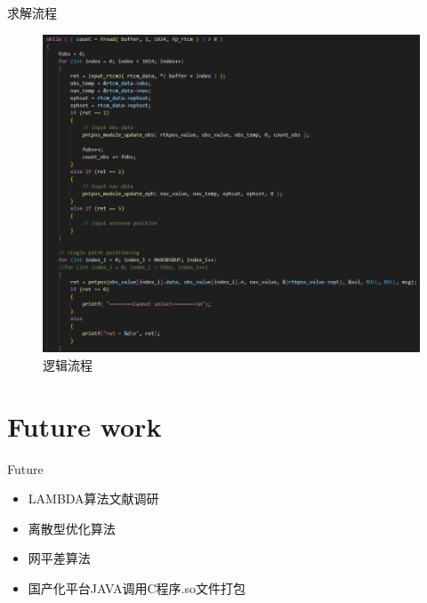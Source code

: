 \begin{frame}{求解流程}
    \begin{figure}
        \centering
        \includegraphics[width=.5\textwidth]{pic/pntpos_process.png}
        \caption{逻辑流程}
        \label{fig:pntpos_process}
    \end{figure}
\end{frame}

\section{Future work}
\begin{frame}{Future}
    \begin{itemize}
        \item LAMBDA算法文献调研
        \item 离散型优化算法
        \item 网平差算法
        \item 国产化平台JAVA调用C程序.so文件打包
    \end{itemize}
\end{frame}